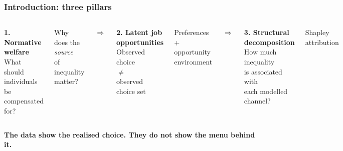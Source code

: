 \documentclass[10pt,aspectratio=169]{beamer}
\begin{document}
\begin{frame}
\frametitle{Introduction: three pillars}

\begin{columns}[T,onlytextwidth]

\centering
\textbf{1. Normative welfare}\\[0.5em]

{\small
What should individuals\\
be compensated for?
}

\vspace{0.6em}

{\footnotesize
Why does the \emph{source}\\
of inequality matter?
}


\centering
\vspace{2em}
$\Longrightarrow$


\centering
\textbf{2. Latent job opportunities}\\[0.5em]

{\small
Observed choice\\
$\neq$\\
observed choice set
}

\vspace{0.6em}

{\footnotesize
Preferences +\\
opportunity environment
}


\centering
\vspace{2em}
$\Longrightarrow$


\centering
\textbf{3. Structural decomposition}\\[0.5em]

{\small
How much inequality\\
is associated with\\
each modelled channel?
}

\vspace{0.6em}

{\footnotesize
Shapley attribution
}

\end{columns}

\vfill

\begin{center}
\end{center}

\vfill

\begin{center}
\small
\textbf{The data show the realised choice. They do not show the menu behind it.}
\end{center}

\end{frame}
\end{document}
